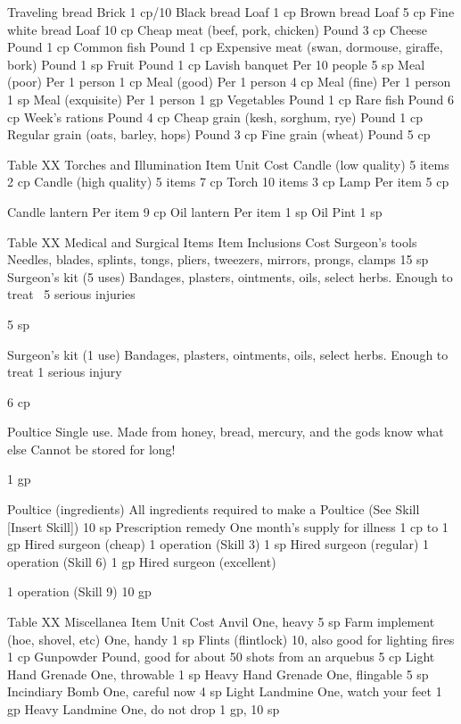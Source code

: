 \documentclass[oneside,11pt,english]{book}
\begin{document}
Traveling bread Brick 1 cp/10 
Black bread Loaf 1 cp 
Brown bread Loaf 5 cp 
Fine white bread Loaf 10 cp 
Cheap meat (beef, pork, chicken) Pound 3 cp 
Cheese Pound 1 cp 
Common fish Pound 1 cp 
Expensive meat (swan, dormouse, giraffe, bork) Pound 1 sp 
Fruit Pound 1 cp 
Lavish banquet Per 10 people 5 sp 
Meal (poor) Per 1 person 1 cp 
Meal (good) Per 1 person 4 cp 
Meal (fine) Per 1 person 1 sp 
Meal (exquisite) Per 1 person 1 gp 
Vegetables Pound 1 cp 
Rare fish Pound 6 cp 
Week's rations Pound 4 cp 
Cheap grain (kesh, sorghum, rye) Pound 1 cp 
Regular grain (oats, barley, hops) Pound 3 cp 
Fine grain (wheat) Pound 5 cp 

 
Table XX Torches and Illumination 
Item Unit Cost 
Candle (low quality) 5 items 2 cp 
Candle (high quality) 5 items 7 cp 
Torch 10 items 3 cp 
Lamp Per item 5 cp 


Candle lantern Per item 9 cp 
Oil lantern Per item 1 sp 
Oil Pint 1 sp 

 
Table XX Medical and Surgical Items 
Item Inclusions Cost 
Surgeon’s tools Needles, blades, splints, tongs, pliers, tweezers, mirrors, prongs, clamps 15 sp 
Surgeon’s kit (5 uses) Bandages, plasters, ointments, oils, select herbs. Enough to treat ~5 serious 
injuries 

5 sp 

Surgeon’s kit (1 use) Bandages, plasters, ointments, oils, select herbs. Enough to treat 1 serious 
injury 

6 cp 

Poultice Single use. Made from honey, bread, mercury, and the gods know what else 
Cannot be stored for long! 

1 gp 

Poultice (ingredients) All ingredients required to make a Poultice (See Skill [Insert Skill]) 10 sp 
Prescription remedy One month’s supply for illness 1 cp to 1 
gp 
Hired surgeon (cheap) 1 operation (Skill 3) 1 sp 
Hired surgeon (regular) 1 operation (Skill 6) 1 gp 
Hired surgeon 
(excellent) 

1 operation (Skill 9) 10 gp 

 
Table XX Miscellanea 
Item Unit Cost 
Anvil One, heavy 5 sp 
Farm implement (hoe, shovel, etc) One, handy 1 sp 
Flints (flintlock) 10, also good for lighting fires 1 cp 
Gunpowder Pound, good for about 50 shots from an arquebus 5 cp 
Light Hand Grenade One, throwable 1 sp 
Heavy Hand Grenade One, flingable 5 sp 
Incindiary Bomb One, careful now 4 sp 
Light Landmine One, watch your feet 1 gp 
Heavy Landmine One, do not drop 1 gp, 10 sp 
\end{document}
